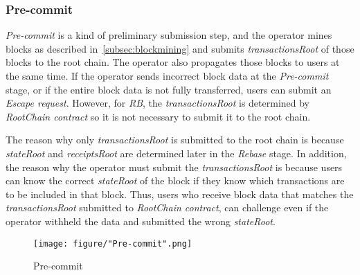 \documentclass[letterpaper, 11pt]{article}
\begin{document}
\subsubsection{Pre-commit}
\begin{CJK}{UTF8}{mj}
\emph{Pre-commit} is a kind of preliminary submission step, and the operator mines blocks as described in~\ref{subsec:blockmining} and submits \emph{transactionsRoot} of those blocks to the root chain. The operator also propagates those blocks to users at the same time. If the operator sends incorrect block data at the \emph{Pre-commit} stage, or if the entire block data is not fully transferred, users can submit an \emph{Escape request}. However, for \emph{RB}, the \emph{transactionsRoot} is determined by \emph{RootChain contract} so it is not necessary to submit it to the root chain.

The reason why only \emph{transactionsRoot} is submitted to the root chain is because \emph{stateRoot} and \emph{receiptsRoot} are determined later in the \emph{Rebase} stage. In addition, the reason why the operator must submit the \emph{transactionsRoot} is because users can know the correct \emph{stateRoot} of the block if they know which transactions are to be included in that block. Thus, users who receive block data that matches the \emph{transactionsRoot} submitted to \emph{RootChain contract}, can challenge even if the operator withheld the data and submitted the wrong \emph{stateRoot}.

\begin{figure}[!h]
\centering
\texttt{[image: figure/"Pre-commit".png]}
\caption{Pre-commit}
\label{fig:pre-commit}
\end{figure}

\end{CJK}
\end{document}
